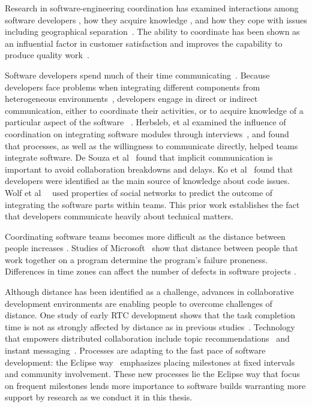 Research in software-engineering coordination has examined interactions among
software developers \cite{carter2004,marczak:re:2008}, how they acquire
knowledge \cite{ehrlich:icgse:2006,nakakoji2010:rdc}, and
how they cope with issues including geographical
separation~\cite{espinosa2007:team_knowledge,herbsleb2003:speed}.
The ability to coordinate has
been shown as an influential factor in customer satisfaction \cite{kraut:1995coordination} and  improves the capability to produce quality work~\cite{faraj2000}.


Software developers spend much of their time
communicating~\cite{perry94}. Because developers face
problems when integrating different components from heterogeneous environments~\cite{redmiles2007:continuous},
developers engage in direct or indirect
communication, either to coordinate their activities, or to acquire knowledge of
a particular aspect of the software ~\cite{nakakoji2010:rdc}.
Herbsleb, et al examined the influence of coordination on integrating software
modules through interviews~\cite{herbsleb1999:architectures}, and found that
processes, as well as the willingness to communicate directly, helped teams
integrate software. De Souza et al~\cite{desouza2007:awarenessnetwork} found that implicit
communication is important to avoid collaboration breakdowns and delays. Ko et al~\cite{ko:icse:2007} found that developers were identified as the main source of knowledge about code issues.
Wolf et al~~\cite{wolf:icse:2009} used properties of social networks to predict the outcome of integrating the software parts within teams.
This prior work establishes the fact that developers communicate heavily about technical matters.

Coordinating software teams becomes more difficult as the distance between people increases \cite{herbsleb:icse:2001}.
Studies of Microsoft~\cite{bird2009:dds_quality,nagappan:icse:2008}
show that distance between people that work together on a
program determine the program's failure proneness.
Differences in time zones can affect the number of defects in software projects \cite{cataldo2009:quality}.

Although distance has been identified as a challenge, advances in collaborative
development environments are enabling people to overcome challenges of distance.
One study of early RTC development
shows that the task completion time is not as strongly affected by distance as in previous studies~\cite{Nguyen:2008Distance}. Technology that empowers distributed collaboration include topic recommendations~\cite{carter2004} and instant messaging~\cite{niinimaki2008}. Processes are adapting to the fast pace of software development: the Eclipse way~\cite{frost:ieeesoftware:2007} emphasizes placing milestones at fixed intervals and community involvement.
These new processes lie the Eclipse way that focus on frequent milestones lends more importance to software builds warranting more support by research as we conduct it in this thesis.

